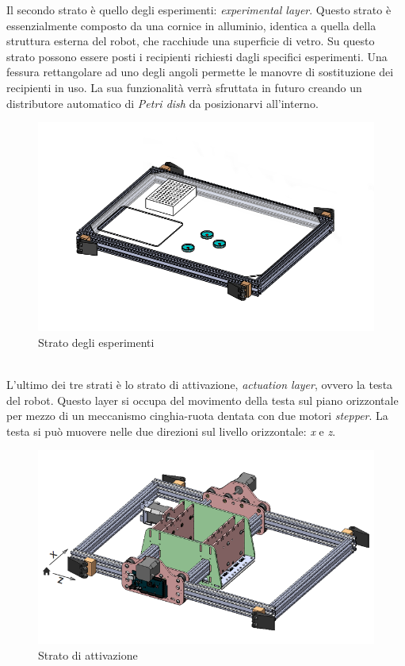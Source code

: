 \pagebreak
Il secondo strato è quello degli esperimenti: \emph{experimental layer}. Questo strato è essenzialmente composto da una cornice in alluminio, identica a quella della struttura esterna del robot, che racchiude una superficie di vetro. Su questo strato possono essere posti i recipienti richiesti dagli specifici esperimenti. Una fessura rettangolare ad uno degli angoli permette le manovre di sostituzione dei recipienti in uso. La sua funzionalità verrà sfruttata in futuro creando un distributore automatico di  \emph{Petri dish} da posizionarvi all'interno.
	\begin{figure}[h]
	  \includegraphics[scale=0.40]{immagini/experiment_layer.png}
		\centering 
	\caption{Strato degli esperimenti}
	\end{figure} 
\\L'ultimo dei tre strati è lo strato di attivazione, \emph{actuation layer}, ovvero la testa del robot.  Questo layer si occupa del movimento della testa sul piano orizzontale per mezzo di un meccanismo cinghia-ruota dentata con due motori \emph{stepper}. La testa si può muovere nelle due direzioni sul livello orizzontale: \emph{x} e \emph{z}.

	\begin{figure}[h]
	  \includegraphics[scale=0.30]{immagini/actuation_layer.png}
		\centering	
	 \caption{Strato di attivazione}
	\end{figure}
\pagebreak

